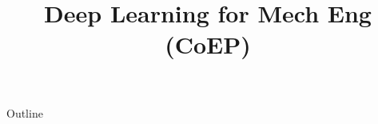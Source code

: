 \documentclass[xcolor=dvipsnames,compress,t,pdf,9pt]{beamer}
\title[\insertframenumber /\inserttotalframenumber]{Deep Learning for Mech Eng (CoEP)}
\begin{document}
	\begin{frame}
	\titlepage
	\end{frame}

	\begin{frame}{Outline}
	    \tableofcontents
	\end{frame}

	
	
	
\end{document}
